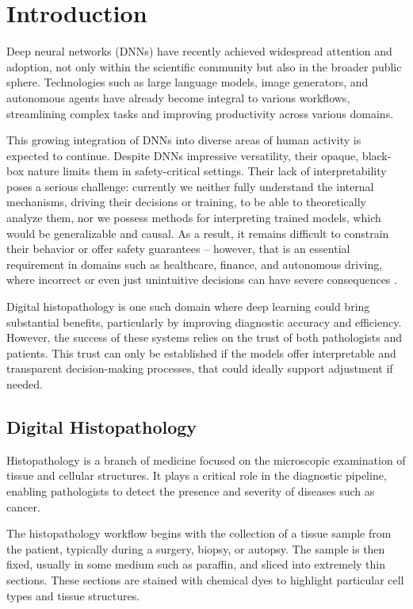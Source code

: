 \chapter{Introduction}

Deep neural networks (DNNs) have recently achieved widespread attention and adoption,
not only within the scientific community but also in the broader public sphere.
Technologies such as large language models, image generators, and autonomous agents
have already become integral to various workflows,
streamlining complex tasks and improving productivity across various domains.

This growing integration of DNNs into diverse areas of human activity is expected to continue.
Despite DNNs impressive versatility, their opaque, black-box nature limits them in safety-critical settings.
Their lack of interpretability poses a serious challenge: currently we neither fully understand the internal mechanisms, driving their decisions or training,
to be able to theoretically analyze them, nor we possess methods for interpreting trained models, which would be generalizable and causal.
As a result, it remains difficult to constrain their behavior or offer safety guarantees -- however, that is an essential requirement in domains such as healthcare, finance, and autonomous driving,
where incorrect or even just unintuitive decisions can have severe consequences \cite{linardatos2020explainable}.

Digital histopathology is one such domain where deep learning could bring substantial benefits,
particularly by improving diagnostic accuracy and efficiency.
However, the success of these systems relies on the trust of both pathologists and patients.
This trust can only be established if the models offer interpretable and transparent decision-making processes,
that could ideally support adjustment if needed.


\newpage
\section{Digital Histopathology}

Histopathology is a branch of medicine focused on the microscopic examination of tissue and cellular structures.
It plays a critical role in the diagnostic pipeline, enabling pathologists to detect the presence and severity of diseases such as cancer.

The histopathology workflow begins with the collection of a tissue sample from the patient,
typically during a surgery, biopsy, or autopsy. The sample is then fixed, usually in some medium such as paraffin,
and sliced into extremely thin sections. These sections are stained with chemical dyes to highlight particular cell types and tissue structures.


